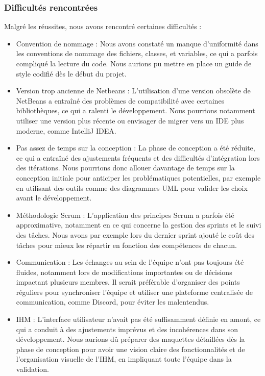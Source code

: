 \documentclass[a4paper]{article}
\begin{document}
\subsubsection{Difficultés rencontrées}
Malgré les réussites, nous avons rencontré certaines difficultés :
\begin{itemize}
    \item Convention de nommage : Nous avons constaté un manque d’uniformité dans les conventions de nommage des fichiers, classes, et variables, ce qui a parfois compliqué la lecture du code. Nous aurions pu mettre en place un guide de style codifié dès le début du projet.
    \item Version trop ancienne de Netbeans : L’utilisation d’une version obsolète de NetBeans a entraîné des problèmes de compatibilité avec certaines bibliothèques, ce qui a ralenti le développement. Nous pourrions notamment utiliser une version plus récente ou envisager de migrer vers un IDE plus moderne, comme IntelliJ IDEA.
    \item Pas assez de temps sur la conception : La phase de conception a été réduite, ce qui a entraîné des ajustements fréquents et des difficultés d’intégration lors des itérations. Nous pourrions donc allouer davantage de temps sur la conception initiale pour anticiper les problématiques potentielles, par exemple en utilisant des outils comme des diagrammes UML pour valider les choix avant le développement.
    \item Méthodologie Scrum : L’application des principes Scrum a parfois été approximative, notamment en ce qui concerne la gestion des sprints et le suivi des tâches. Nous avons par exemple lors du dernier sprint ajouté le coût des tâches pour mieux les répartir en fonction des compétences de chacun.
    \item Communication : Les échanges au sein de l’équipe n’ont pas toujours été fluides, notamment lors de modifications importantes ou de décisions impactant plusieurs membres. Il serait préférable d'organiser des points réguliers pour synchroniser l’équipe et utiliser une plateforme centralisée de communication, comme Discord, pour éviter les malentendus.
    \item IHM : L'interface utilisateur n'avait pas été suffisamment définie en amont, ce qui a conduit à des ajustements imprévus et des incohérences dans son développement. Nous aurions dû préparer des maquettes détaillées dès la phase de conception pour avoir une vision claire des fonctionnalités et de l'organisation visuelle de l'IHM, en impliquant toute l'équipe dans la validation.
\end{itemize}
\end{document}
